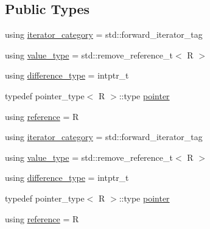 \subsection*{Public Types}
\begin{DoxyCompactItemize}
\item 
using \mbox{\hyperlink{structrah_1_1iterator__facade_3_01_i_00_01_r_00_01std_1_1forward__iterator__tag_01_4_a3ed65491660beef4bd9488a3f511c934}{iterator\+\_\+category}} = std\+::forward\+\_\+iterator\+\_\+tag
\item 
using \mbox{\hyperlink{structrah_1_1iterator__facade_3_01_i_00_01_r_00_01std_1_1forward__iterator__tag_01_4_a95da65d8da6515cbd927873f565a9cdc}{value\+\_\+type}} = std\+::remove\+\_\+reference\+\_\+t$<$ R $>$
\item 
using \mbox{\hyperlink{structrah_1_1iterator__facade_3_01_i_00_01_r_00_01std_1_1forward__iterator__tag_01_4_a9f8ec957ea36b46eae3ca8bb89b6cf1c}{difference\+\_\+type}} = intptr\+\_\+t
\item 
typedef pointer\+\_\+type$<$ R $>$\+::type \mbox{\hyperlink{structrah_1_1iterator__facade_3_01_i_00_01_r_00_01std_1_1forward__iterator__tag_01_4_ae7253d3dac99a9b2bead5b6ea82ff2b1}{pointer}}
\item 
using \mbox{\hyperlink{structrah_1_1iterator__facade_3_01_i_00_01_r_00_01std_1_1forward__iterator__tag_01_4_a19aa13e142ee687a3f9dd672d68a25c7}{reference}} = R
\item 
using \mbox{\hyperlink{structrah_1_1iterator__facade_3_01_i_00_01_r_00_01std_1_1forward__iterator__tag_01_4_a3ed65491660beef4bd9488a3f511c934}{iterator\+\_\+category}} = std\+::forward\+\_\+iterator\+\_\+tag
\item 
using \mbox{\hyperlink{structrah_1_1iterator__facade_3_01_i_00_01_r_00_01std_1_1forward__iterator__tag_01_4_a95da65d8da6515cbd927873f565a9cdc}{value\+\_\+type}} = std\+::remove\+\_\+reference\+\_\+t$<$ R $>$
\item 
using \mbox{\hyperlink{structrah_1_1iterator__facade_3_01_i_00_01_r_00_01std_1_1forward__iterator__tag_01_4_a9f8ec957ea36b46eae3ca8bb89b6cf1c}{difference\+\_\+type}} = intptr\+\_\+t
\item 
typedef pointer\+\_\+type$<$ R $>$\+::type \mbox{\hyperlink{structrah_1_1iterator__facade_3_01_i_00_01_r_00_01std_1_1forward__iterator__tag_01_4_ae7253d3dac99a9b2bead5b6ea82ff2b1}{pointer}}
\item 
using \mbox{\hyperlink{structrah_1_1iterator__facade_3_01_i_00_01_r_00_01std_1_1forward__iterator__tag_01_4_a19aa13e142ee687a3f9dd672d68a25c7}{reference}} = R
\end{DoxyCompactItemize}
